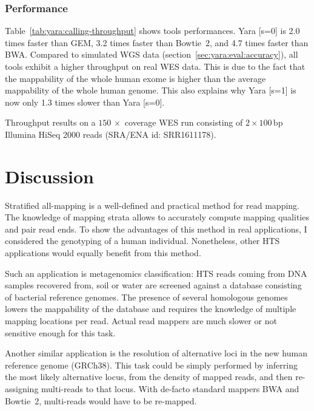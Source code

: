 \subsubsection{Performance}

Table~\ref{tab:yara:calling-throughput} shows tools performances.
Yara [s=0] is 2.0 times faster than GEM, 3.2 times faster than Bowtie~2, and 4.7 times faster than BWA.
Compared to simulated WGS data (section~\ref{sec:yara:eval:accuracy}), all tools exhibit a higher throughput on real WES data.
This is due to the fact that the mappability of the whole human exome is higher than the average mappability of the whole human genome.
This also explains why Yara [s=1] is now only 1.3 times slower than Yara [s=0].

\begin{table}[b]
\begin{center}
\caption[Yara throughput on whole exome sequencing data -- Illumina HiSeq 2000]{Throughput results on a $150\, \times$ coverage WES run consisting of $2 \times 100\,\text{bp}$ Illumina HiSeq 2000 reads (SRA/ENA id: SRR1611178).}
\sffamily

\label{tab:yara:calling-throughput}
\end{center}
\end{table}



\section{Discussion}

Stratified all-mapping is a well-defined and practical method for read mapping.
The knowledge of mapping strata allows to accurately compute mapping qualities and pair read ends.
To show the advantages of this method in real applications, I considered the genotyping of a human individual.
Nonetheless, other HTS applications would equally benefit from this method.

Such an application is metagenomics classification:
HTS reads coming from DNA samples recovered from, \eg soil or water are screened against a database consisting of bacterial reference genomes.
The presence of several homologous genomes lowers the mappability of the database and requires the knowledge of multiple mapping locations per read.
Actual read mappers are much slower or not sensitive enough for this task.

Another similar application is the resolution of alternative loci in the new human reference genome (GRCh38).
This task could be simply performed by inferring the most likely alternative locus, \eg from the density of mapped reads, and then re-assigning multi-reads to that locus.
With de-facto standard mappers BWA and Bowtie~2, multi-reads would have to be re-mapped.

